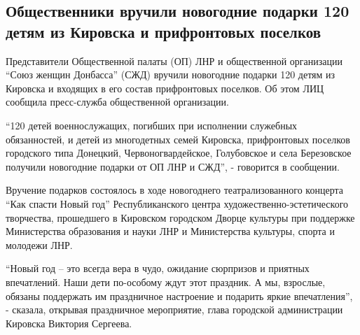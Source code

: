  
 
 
 
 
\subsection{Общественники вручили новогодние подарки 120 детям из Кировска и прифронтовых поселков}
\label{sec:23_12_2021.stz.news.lnr.lug_info.1.deti_kirovsk}


Представители Общественной палаты (ОП) ЛНР и общественной организации \enquote{Союз
женщин Донбасса} (СЖД) вручили новогодние подарки 120 детям из Кировска и
входящих в его состав прифронтовых поселков. Об этом ЛИЦ сообщила пресс-служба
общественной организации.


\enquote{120 детей военнослужащих, погибших при исполнении служебных обязанностей, и
детей из многодетных семей Кировска, прифронтовых поселков городского типа
Донецкий, Червоногвардейское, Голубовское и села Березовское получили
новогодние подарки от ОП ЛНР и СЖД}, - говорится в сообщении.


Вручение подарков состоялось в ходе новогоднего театрализованного концерта \enquote{Как
спасти Новый год} Республиканского центра художественно-эстетического
творчества, прошедшего в Кировском городском Дворце культуры при поддержке
Министерства образования и науки ЛНР и Министерства культуры, спорта и молодежи
ЛНР.


\enquote{Новый год – это всегда вера в чудо, ожидание сюрпризов и приятных впечатлений.
Наши дети по-особому ждут этот праздник. А мы, взрослые, обязаны поддержать им
праздничное настроение и подарить яркие впечатления}, - сказала, открывая
праздничное мероприятие, глава городской администрации Кировска Виктория
Сергеева.

